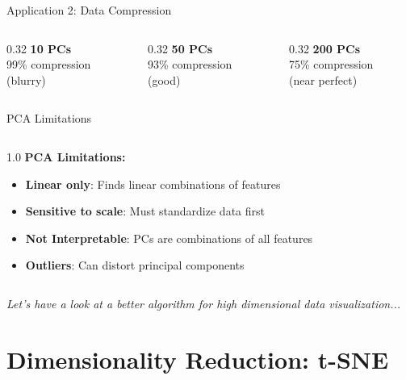 \begin{frame}{Application 2: Data Compression}
\vspace{0.35em}
\begin{columns}[c]
\begin{column}{0.32\textwidth}
\centering
\small \textbf{10 PCs}\\99\% compression \\(blurry)
\end{column}
\begin{column}{0.32\textwidth}
\centering
\small \textbf{50 PCs}\\93\% compression \\(good)
\end{column}
\begin{column}{0.32\textwidth}
\centering
\small \textbf{200 PCs}\\75\% compression \\(near perfect)
\end{column}
\end{columns}

\end{frame}


\begin{frame}{PCA Limitations}

\begin{columns}[c]
\begin{column}{1.0\textwidth}
\textbf{PCA Limitations:}

\begin{itemize}
\item \textbf{Linear only}: Finds linear combinations of features
\item \textbf{Sensitive to scale}: Must standardize data first
\item \textbf{Not Interpretable}: PCs are combinations of all features
\item \textbf{Outliers}: Can distort principal components
\end{itemize}

\end{column}
\end{columns}

\vspace{1em}
\centering
\small \textit{Let's have a look at a better algorithm for high dimensional data visualization...}

\end{frame}




\section{Dimensionality Reduction: t-SNE}

